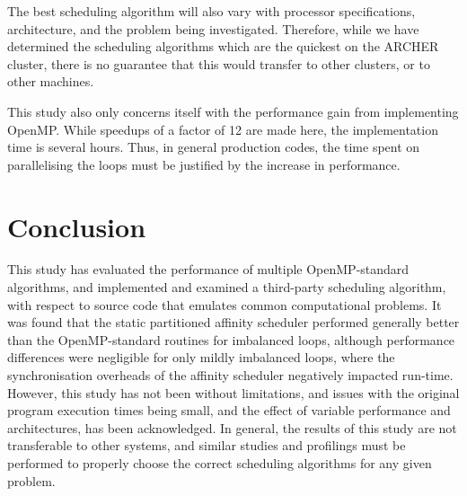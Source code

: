 \documentclass{article} %
\begin{document}
The best scheduling algorithm will also vary with processor specifications, architecture, and the problem being investigated.
Therefore, while we have determined the scheduling algorithms which are the quickest on the ARCHER cluster, there is no guarantee that this would transfer to other clusters, or to other machines.

This study also only concerns itself with the performance gain from implementing OpenMP.
While speedups of a factor of 12 are made here, the implementation time is several hours.
Thus, in general production codes, the time spent on parallelising the loops must be justified by the increase in performance.

\section*{Conclusion}

This study has evaluated the performance of multiple OpenMP-standard algorithms, and implemented and examined a third-party scheduling algorithm, with respect to source code that emulates common computational problems.
It was found that the static partitioned affinity scheduler performed generally better than the OpenMP-standard routines for imbalanced loops, although performance differences were negligible for only mildly imbalanced loops, where the synchronisation overheads of the affinity scheduler negatively impacted run-time.
However, this study has not been without limitations, and issues with the original program execution times being small, and the effect of variable performance and architectures, has been acknowledged.
In general, the results of this study are not transferable to other systems, and similar studies and profilings must be performed to properly choose the correct scheduling algorithms for any given problem.




\end{document}
